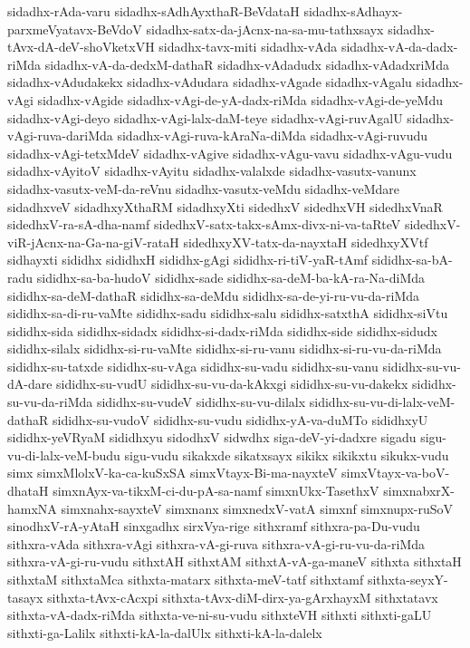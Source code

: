 {sidadhx-rAda-varu
sidadhx-sAdhAyxthaR-BeVdataH
sidadhx-sAdhayx-parxmeVyatavx-BeVdoV
sidadhx-satx-da-jAcnx-na-sa-mu-tathxsayx
sidadhx-tAvx-dA-deV-shoVketxVH
sidadhx-tavx-miti
sidadhx-vAda
sidadhx-vA-da-dadx-riMda
sidadhx-vA-da-dedxM-dathaR
sidadhx-vAdadudx
sidadhx-vAdadxriMda
sidadhx-vAdudakekx
sidadhx-vAdudara
sidadhx-vAgade
sidadhx-vAgalu
sidadhx-vAgi
sidadhx-vAgide
sidadhx-vAgi-de-yA-dadx-riMda
sidadhx-vAgi-de-yeMdu
sidadhx-vAgi-deyo
sidadhx-vAgi-lalx-daM-teye
sidadhx-vAgi-ruvAgalU
sidadhx-vAgi-ruva-dariMda
sidadhx-vAgi-ruva-kAraNa-diMda
sidadhx-vAgi-ruvudu
sidadhx-vAgi-tetxMdeV
sidadhx-vAgive
sidadhx-vAgu-vavu
sidadhx-vAgu-vudu
sidadhx-vAyitoV
sidadhx-vAyitu
sidadhx-valalxde
sidadhx-vasutx-vanunx
sidadhx-vasutx-veM-da-reVnu
sidadhx-vasutx-veMdu
sidadhx-veMdare
sidadhxveV
sidadhxyXthaRM
sidadhxyXti
sidedhxV
sidedhxVH
sidedhxVnaR
sidedhxV-ra-sA-dha-namf
sidedhxV-satx-takx-sAmx-divx-ni-va-taRteV
sidedhxV-viR-jAcnx-na-Ga-na-giV-rataH
sidedhxyXV-tatx-da-nayxtaH
sidedhxyXVtf
sidhayxti
sididhx
sididhxH
sididhx-gAgi
sididhx-ri-tiV-yaR-tAmf
sididhx-sa-bA-radu
sididhx-sa-ba-hudoV
sididhx-sade
sididhx-sa-deM-ba-kA-ra-Na-diMda
sididhx-sa-deM-dathaR
sididhx-sa-deMdu
sididhx-sa-de-yi-ru-vu-da-riMda
sididhx-sa-di-ru-vaMte
sididhx-sadu
sididhx-salu
sididhx-satxthA
sididhx-siVtu
sididhx-sida
sididhx-sidadx
sididhx-si-dadx-riMda
sididhx-side
sididhx-sidudx
sididhx-silalx
sididhx-si-ru-vaMte
sididhx-si-ru-vanu
sididhx-si-ru-vu-da-riMda
sididhx-su-tatxde
sididhx-su-vAga
sididhx-su-vadu
sididhx-su-vanu
sididhx-su-vu-dA-dare
sididhx-su-vudU
sididhx-su-vu-da-kAkxgi
sididhx-su-vu-dakekx
sididhx-su-vu-da-riMda
sididhx-su-vudeV
sididhx-su-vu-dilalx
sididhx-su-vu-di-lalx-veM-dathaR
sididhx-su-vudoV
sididhx-su-vudu
sididhx-yA-va-duMTo
sididhxyU
sididhx-yeVRyaM
sididhxyu
sidodhxV
sidwdhx
siga-deV-yi-dadxre
sigadu
sigu-vu-di-lalx-veM-budu
sigu-vudu
sikakxde
sikatxsayx
sikikx
sikikxtu
sikukx-vudu
simx
simxMlolxV-ka-ca-kuSxSA
simxVtayx-Bi-ma-nayxteV
simxVtayx-va-boV-dhataH
simxnAyx-va-tikxM-ci-du-pA-sa-namf
simxnUkx-TasethxV
simxnabxrX-hamxNA
simxnahx-sayxteV
simxnanx
simxnedxV-vatA
simxnf
simxnupx-ruSoV
sinodhxV-rA-yAtaH
sinxgadhx
sirxVya-rige
sithxramf
sithxra-pa-Du-vudu
sithxra-vAda
sithxra-vAgi
sithxra-vA-gi-ruva
sithxra-vA-gi-ru-vu-da-riMda
sithxra-vA-gi-ru-vudu
sithxtAH
sithxtAM
sithxtA-vA-ga-maneV
sithxta
sithxtaH
sithxtaM
sithxtaMca
sithxta-matarx
sithxta-meV-tatf
sithxtamf
sithxta-seyxY-tasayx
sithxta-tAvx-cAcxpi
sithxta-tAvx-diM-dirx-ya-gArxhayxM
sithxtatavx
sithxta-vA-dadx-riMda
sithxta-ve-ni-su-vudu
sithxteVH
sithxti
sithxti-gaLU
sithxti-ga-Lalilx
sithxti-kA-la-dalUlx
sithxti-kA-la-dalelx
}
